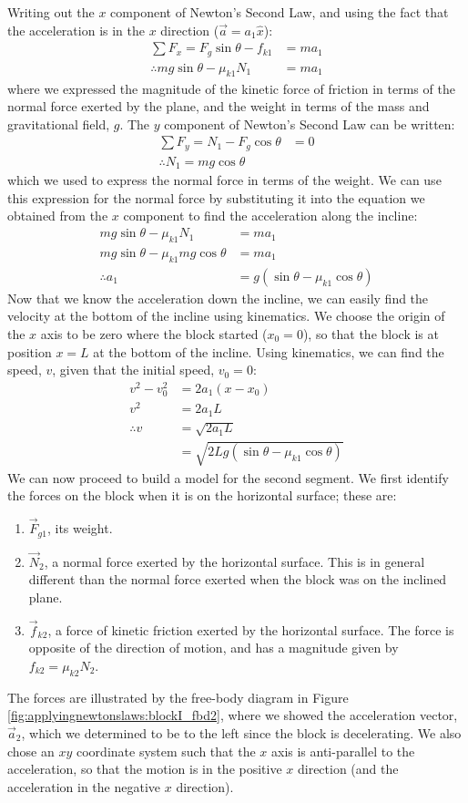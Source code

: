\begin{example}
Writing out the $x$ component of Newton's Second Law, and using the fact that the acceleration is in the $x$ direction ($\vec a=a_1\hat x$):
\begin{align*}
\sum F_x = F_g\sin\theta - f_{k1} &= ma_1\\
\therefore mg\sin\theta - \mu_{k1} N_1 &= ma_1
\end{align*}
where we expressed the magnitude of the kinetic force of friction in terms of the normal force exerted by the plane, and the weight in terms of the mass and gravitational field, $g$. The $y$ component of Newton's Second Law can be written:
\begin{align*}
\sum F_y = N_1-F_g\cos\theta &= 0\\
\therefore N_1 = mg\cos\theta
\end{align*}
which we used to express the normal force in terms of the weight. We can use this expression for the normal force by substituting it into the equation we obtained from the $x$ component to find the acceleration along the incline:
\begin{align*}
mg\sin\theta - \mu_{k1} N_1 &= ma_1\\
mg\sin\theta - \mu_{k1} mg\cos\theta&= ma_1\\
\therefore a_1 &= g(\sin\theta-\mu_{k1}\cos\theta)
\end{align*}
Now that we know the acceleration down the incline, we can easily find the velocity at the bottom of the incline using kinematics. We choose the origin of the $x$ axis to be zero where the block started ($x_0=0$), so that the block is at position $x=L$ at the bottom of the incline. Using kinematics, we can find the speed, $v$, given that the initial speed, $v_0=0$:
\begin{align*}
v^2-v_0^2&=2a_1(x-x_0)\\
v^2&=2a_1L\\
\therefore v &= \sqrt{2a_1L}\\
&=\sqrt{2Lg(\sin\theta-\mu_{k1}\cos\theta)}
\end{align*}
We can now proceed to build a model for the second segment. We first identify the forces on the block when it is on the horizontal surface; these are:
\begin{enumerate}
\item $\vec F_{g1}$, its weight.
\item $\vec N_2$, a normal force exerted by the horizontal surface. This is in general different than the normal force exerted when the block was on the inclined plane. 
\item $\vec f_{k2}$, a force of kinetic friction exerted by the horizontal surface. The force is opposite of the direction of motion, and has a magnitude given by $f_{k2}=\mu_{k2}N_2$.
\end{enumerate}
The forces are illustrated by the free-body diagram in Figure \ref{fig:applyingnewtonslaws:blockI_fbd2}, where we showed the acceleration vector, $\vec a_2$, which we determined to be to the left since the block is decelerating. We also chose an $xy$ coordinate system such that the $x$ axis is anti-parallel to the acceleration, so that the motion is in the positive $x$ direction (and the acceleration in the negative $x$ direction).


\end{example}
